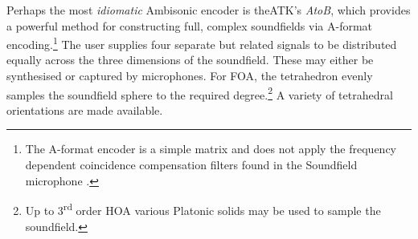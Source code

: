 \documentclass{article}
\begin{document}
Perhaps the most \emph{idiomatic} Ambisonic encoder is the\linebreak ATK's \emph{AtoB}, which provides a powerful method for constructing full, complex soundfields via A-format encoding.\footnote{The A-format encoder is a simple matrix and does not apply the frequency dependent coincidence compensation filters found in the Soundfield microphone \cite{farrar:1979soundfield}.} The user supplies four separate but related signals to be distributed equally across the three dimensions of the soundfield. These may either be synthesised or captured by microphones. For FOA, the tetrahedron evenly samples the soundfield sphere to the required degree.\footnote{Up to 3\textsuperscript{rd} order HOA various Platonic solids may be used to sample the soundfield.} A variety of tetrahedral orientations are made available.




\end{document}
